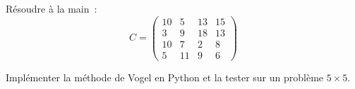 \begin{exercice}
R\'esoudre \`a la main~:
\[
C = \begin{pmatrix}
  10 & 5 & 13 & 15 \\
  3 & 9 & 18 & 13 \\
  10 & 7 & 2 & 8 \\
  5 & 11 & 9 & 6
\end{pmatrix}
\]
\end{exercice}

\begin{exercice}
Impl\'ementer la m\'ethode de Vogel en Python et la tester sur un probl\`eme
$5 \times 5$.
\end{exercice}
